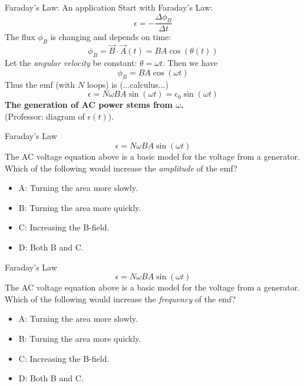 \documentclass{beamer}
\begin{document}
\begin{frame}{Faraday's Law: An application}
Start with Faraday's Law:
\begin{equation}
\epsilon = - \frac{\Delta \phi_B}{\Delta t}
\end{equation}
The flux $\phi_B$ is changing and depends on time:
\begin{equation}
\phi_B = \vec{B} \cdot \vec{A}(t) = BA\cos(\theta(t))
\end{equation}
Let the \textit{angular velocity} be constant: $\theta = \omega t$.  Then we have
\begin{equation}
\phi_B  = BA\cos(\omega t)
\end{equation}
Thus the emf (with $N$ loops) is (...calculus...)
\begin{equation}
\epsilon = N\omega BA \sin(\omega t) = \epsilon_0 \sin(\omega t)
\end{equation}
\textbf{The generation of AC power stems from $\omega$.} \\ (Professor: diagram of $\epsilon(t)$).
\end{frame}

\begin{frame}{Faraday's Law}
\begin{equation}
\epsilon = N\omega BA \sin(\omega t)
\end{equation}
The AC voltage equation above is a basic model for the voltage from a generator.  Which of the following would increase the \textit{amplitude} of the emf?
\begin{itemize}
\item A: Turning the area more slowly.
\item B: Turning the area more quickly.
\item C: Increasing the B-field.
\item D: Both B and C.
\end{itemize}
\end{frame}

\begin{frame}{Faraday's Law}
\begin{equation}
\epsilon = N\omega BA \sin(\omega t)
\end{equation}
The AC voltage equation above is a basic model for the voltage from a generator.  Which of the following would increase the \textit{frequency} of the emf?
\begin{itemize}
\item A: Turning the area more slowly.
\item B: Turning the area more quickly.
\item C: Increasing the B-field.
\item D: Both B and C.
\end{itemize}
\end{frame}
\end{document}
